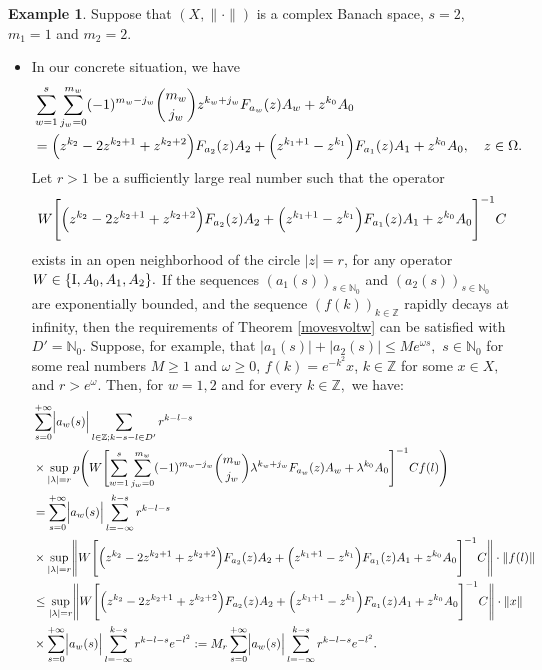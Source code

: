 \documentclass{amsart}
\theoremstyle{definition}
\newtheorem{example}[thm]{Example}
\theoremstyle{remark}
\numberwithin{equation}{section}
\begin{document}
\begin{example}\label{parkw}
Suppose that $(X,\| \cdot \|)$ is a complex Banach space, $s=2$, $m_{1}=1$ and $m_{2}=2 $.
\begin{itemize}
\item[(i)] In our concrete situation, we have
\begin{align*}&
\sum_{w=1}^{s}\sum_{j_{w}=0}^{m_{w}}(-1)^{m_{w}-j_{w}}\binom{m_{w}}{j_{w}}z^{k_{w}+j_{w}}F_{a_{w}}(z)A_{w}+z^{k_{0}}A_{0}
\\&= \Bigl( z^{k_{2}}-2z^{k_{2}+1}+z^{k_{2}+2}\Bigr)F_{a_{2}}(z)A_{2}+\Bigl( z^{k_{1}+1}-z^{k_{1}}\Bigr)F_{a_{1}}(z)A_{1}+z^{k_{0}}A_{0},\quad z\in \Omega.
\end{align*}
Let $r>1$ be a sufficiently large real number such that the operator $$W\Biggl[\Bigl( z^{k_{2}}-2z^{k_{2}+1}+z^{k_{2}+2}\Bigr)F_{a_{2}}(z)A_{2}+\Bigl( z^{k_{1}+1}-z^{k_{1}}\Bigr)F_{a_{1}}(z)A_{1}+z^{k_{0}}A_{0}\Biggr]^{-1}C$$
exists in an open neighborhood of the circle $|z|=r$, for any operator $W\in \{{\rm I}, A_{0},A_{1},A_{2}\}.$ If the sequences $(a_{1}(s))_{s\in {\mathbb N}_{0}}$ and $(a_{2}(s))_{s\in {\mathbb N}_{0}}$ are exponentially bounded, and the sequence $(f(k))_{k\in {\mathbb Z}}$ rapidly decays at infinity, then the requirements of Theorem \ref{movesvoltw} can be satisfied with $D'={\mathbb N}_{0}.$ Suppose, for example, that $|a_{1}(s)|+|a_{2}(s)| \leq Me^{\omega s},$ $s\in {\mathbb N}_{0}$ for some real numbers $M\geq 1$ and $\omega \geq 0$, $f(k)=e^{-k^{2}}x$, $k\in {\mathbb Z}$ for some $x\in X,$ and $r>e^{\omega}.$ Then, for $w=1,2$ and for every $k\in {\mathbb Z},$ we have:{\scriptsize 
\begin{align*} & 
\sum_{s=0}^{+\infty}\Bigl| a_{w}(s)\Bigr| \sum_{l\in {\mathbb Z}; k-s-l\in D'}  r^{k-l-s}  \\  &  \times \sup_{|\lambda|=r}  p\Biggl( W\Biggl[\sum_{w=1}^{s}\sum_{j_{w}=0}^{m_{w}}(-1)^{m_{w}-j_{w}}\binom{m_{w}}{j_{w}}\lambda^{k_{w}+j_{w}}F_{a_{w}}(z)A_{w}+\lambda^{k_{0}}A_{0}\Biggr]^{-1}Cf(l)\Biggr) 
\\& =\sum_{s=0}^{+\infty}\Bigl| a_{w}(s)\Bigr| \sum_{l=-\infty}^{k-s}  r^{k-l-s}  \\  &  \times \sup_{|\lambda|=r} 
\Biggl\| W\Biggl[\Bigl( z^{k_{2}}-2z^{k_{2}+1}+z^{k_{2}+2}\Bigr)F_{a_{2}}(z)A_{2}+\Bigl( z^{k_{1}+1}-z^{k_{1}}\Bigr)F_{a_{1}}(z)A_{1}+z^{k_{0}}A_{0}\Biggr]^{-1}C\Biggr\| \cdot \| f(l)\|
\\& 
\leq \sup_{|\lambda|=r} 
\Biggl\| W\Biggl[\Bigl( z^{k_{2}}-2z^{k_{2}+1}+z^{k_{2}+2}\Bigr)F_{a_{2}}(z)A_{2}+\Bigl( z^{k_{1}+1}-z^{k_{1}}\Bigr)F_{a_{1}}(z)A_{1}+z^{k_{0}}A_{0}\Biggr]^{-1}C\Biggr\| \cdot \| x\| \\& \times \sum_{s=0}^{+\infty}\Bigl| a_{w}(s)\Bigr| \sum_{l=-\infty}^{k-s}  r^{k-l-s}e^{-l^{2}} := M_{r}\sum_{s=0}^{+\infty}\Bigl| a_{w}(s)\Bigr| \sum_{l=-\infty}^{k-s}  r^{k-l-s}e^{-l^{2}}.

\end{align*}}
\end{itemize}
\end{example}
\end{document}
